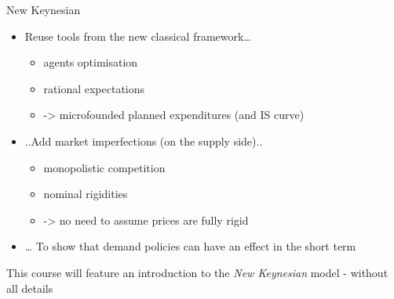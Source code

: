 \begin{frame}{New Keynesian}
\protect\hypertarget{new-keynesian-1}{}
\begin{itemize}
\tightlist
\item
  Reuse tools from the new classical framework\ldots{}

  \begin{itemize}
  \tightlist
  \item
    agents optimisation
  \item
    rational expectations
  \item
    -\textgreater{} microfounded planned expenditures (and IS curve)
  \end{itemize}
\item
  ..Add market imperfections (on the supply side)..

  \begin{itemize}
  \tightlist
  \item
    monopolistic competition
  \item
    nominal rigidities
  \item
    -\textgreater{} no need to assume prices are fully rigid
  \end{itemize}
\item
  \ldots{} To show that demand policies can have an effect in the short
  term
\end{itemize}

This course will feature an introduction to the \emph{New Keynesian}
model - without all details
\end{frame}

